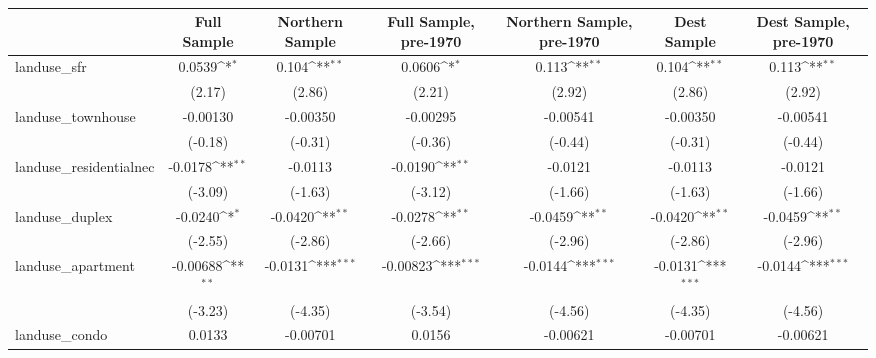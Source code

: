 \begin{table}[htbp]\centering
\def\sym#1{\ifmmode^{#1}\else\(^{#1}\)\fi}
\caption{ \label{tab1}}
\begin{tabular}{l*{6}{c}}
\toprule
                    &\multicolumn{1}{c}{Full Sample}&\multicolumn{1}{c}{Northern Sample}&\multicolumn{1}{c}{Full Sample, pre-1970}&\multicolumn{1}{c}{Northern Sample, pre-1970}&\multicolumn{1}{c}{Dest Sample}&\multicolumn{1}{c}{Dest Sample, pre-1970}\\
\midrule
landuse\_sfr         &      0.0539\sym{*}  &       0.104\sym{**} &      0.0606\sym{*}  &       0.113\sym{**} &       0.104\sym{**} &       0.113\sym{**} \\
                    &      (2.17)         &      (2.86)         &      (2.21)         &      (2.92)         &      (2.86)         &      (2.92)         \\
\addlinespace
landuse\_townhouse   &    -0.00130         &    -0.00350         &    -0.00295         &    -0.00541         &    -0.00350         &    -0.00541         \\
                    &     (-0.18)         &     (-0.31)         &     (-0.36)         &     (-0.44)         &     (-0.31)         &     (-0.44)         \\
\addlinespace
landuse\_residentialnec&     -0.0178\sym{**} &     -0.0113         &     -0.0190\sym{**} &     -0.0121         &     -0.0113         &     -0.0121         \\
                    &     (-3.09)         &     (-1.63)         &     (-3.12)         &     (-1.66)         &     (-1.63)         &     (-1.66)         \\
\addlinespace
landuse\_duplex      &     -0.0240\sym{*}  &     -0.0420\sym{**} &     -0.0278\sym{**} &     -0.0459\sym{**} &     -0.0420\sym{**} &     -0.0459\sym{**} \\
                    &     (-2.55)         &     (-2.86)         &     (-2.66)         &     (-2.96)         &     (-2.86)         &     (-2.96)         \\
\addlinespace
landuse\_apartment   &    -0.00688\sym{**} &     -0.0131\sym{***}&    -0.00823\sym{***}&     -0.0144\sym{***}&     -0.0131\sym{***}&     -0.0144\sym{***}\\
                    &     (-3.23)         &     (-4.35)         &     (-3.54)         &     (-4.56)         &     (-4.35)         &     (-4.56)         \\
\addlinespace
landuse\_condo       &      0.0133         &    -0.00701         &      0.0156         &    -0.00621         &    -0.00701         &    -0.00621         \\

\end{tabular}
\end{table}

